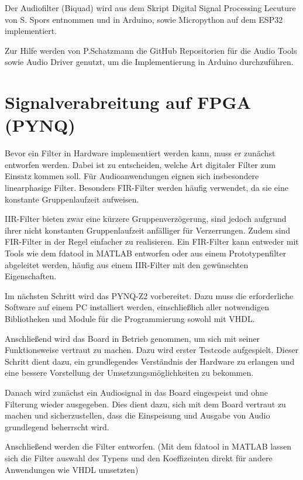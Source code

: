 \documentclass[
  ngerman,
  letterpaper,
  DIV=11]{scrreprt}
\begin{document}
Der Audiofilter (Biquad) wird aus dem Skript Digital Signal Processing
Lecuture von S. Spors entnommen und in Arduino, sowie Micropython auf
dem ESP32 implementiert.

Zur Hilfe werden von P.Schatzmann die GitHub Repositorien für die Audio
Tools sowie Audio Driver genutzt, um die Implementierung in Arduino
durchzuführen.

\chapter{Signalverabreitung auf FPGA
(PYNQ)}\label{signalverabreitung-auf-fpga-pynq}

Bevor ein Filter in Hardware implementiert werden kann, muss er zunächst
entworfen werden. Dabei ist zu entscheiden, welche Art digitaler Filter
zum Einsatz kommen soll. Für Audioanwendungen eignen sich insbesondere
linearphasige Filter. Besonders FIR-Filter werden häufig verwendet, da
sie eine konstante Gruppenlaufzeit aufweisen.

IIR-Filter bieten zwar eine kürzere Gruppenverzögerung, sind jedoch
aufgrund ihrer nicht konstanten Gruppenlaufzeit anfälliger für
Verzerrungen. Zudem sind FIR-Filter in der Regel einfacher zu
realisieren. Ein FIR-Filter kann entweder mit Tools wie dem fdatool in
MATLAB entworfen oder aus einem Prototypenfilter abgeleitet werden,
häufig aus einem IIR-Filter mit den gewünschten Eigenschaften.

Im nächsten Schritt wird das PYNQ-Z2 vorbereitet. Dazu muss die
erforderliche Software auf einem PC installiert werden, einschließlich
aller notwendigen Bibliotheken und Module für die Programmierung sowohl
mit VHDL.

Anschließend wird das Board in Betrieb genommen, um sich mit seiner
Funktionsweise vertraut zu machen. Dazu wird erster Testcode
aufgespielt. Dieser Schritt dient dazu, ein grundlegendes Verständnis
der Hardware zu erlangen und eine bessere Vorstellung der
Umsetzungsmöglichkeiten zu bekommen.

Danach wird zunächst ein Audiosignal in das Board eingespeist und ohne
Filterung wieder ausgegeben. Dies dient dazu, sich mit dem Board
vertraut zu machen und sicherzustellen, dass die Einspeisung und Ausgabe
von Audio grundlegend beherrscht wird.

Anschließend werden die Filter entworfen. (Mit dem fdatool in MATLAB
lassen sich die Filter auswahl des Typens und den Koeffizeinten direkt
für andere Anwendungen wie VHDL umsetzten)
\end{document}
